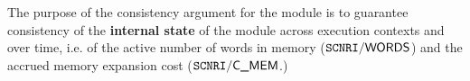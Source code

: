 The purpose of the consistency argument for the \mxpMod{} module is to guarantee consistency of the \textbf{internal state} of the module
across execution contexts and over time, i.e. of
the active number of words in memory ($\texttt{SCNRI}\textsf{/}{\textsf{\textsf{WORDS}}}$) and
the accrued memory expansion cost ($\texttt{SCNRI}\textsf{/}{\textsf{\textsf{C\_MEM}}}$.)
